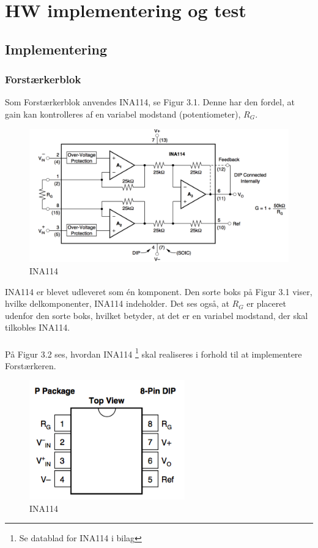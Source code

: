 \chapter{HW implementering og test}

\section{Implementering}

\subsection{Forstærkerblok}
Som Forstærkerblok anvendes INA114, se Figur 3.1. Denne har den fordel, at gain kan kontrolleres af en variabel modstand (potentiometer), $R_{G}$. 

\begin{figure}[H]
	\centering
	\includegraphics[width=1\textwidth]{Figurer/Snip20151117_104}
	\caption{INA114}
\end{figure}

INA114 er blevet udleveret som én komponent. Den sorte boks på Figur 3.1 viser, hvilke delkomponenter, INA114 indeholder. Det ses også, at $R_{G}$ er placeret udenfor den sorte boks, hvilket betyder, at det er en variabel modstand, der skal tilkobles INA114.  
\\
\\
På Figur 3.2 ses, hvordan INA114 \footnote{Se datablad for INA114 i bilag} skal realiseres i forhold til at implementere Forstærkeren. 

\begin{figure}[H]
	\centering
	\includegraphics[width=0.6\textwidth]{Figurer/Snip20151207_47}
	\caption{INA114}
\end{figure}

